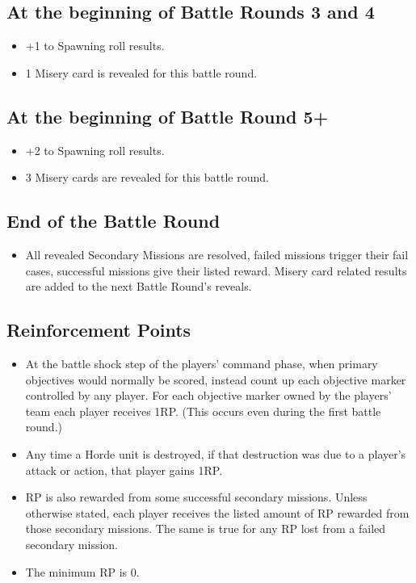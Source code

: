\documentclass{HordeModeTarot}
\begin{document}
\subsection{At the beginning of Battle Rounds 3 and 4 }
\begin{itemize}
\item +1 to Spawning roll results. 
\item 1 Misery card is revealed for this battle round.
\end{itemize}

\subsection{At the beginning of Battle Round 5+ }
\begin{itemize}
\item +2 to Spawning roll results. 
\item 3 Misery cards are revealed for this battle round.
\end{itemize}

\subsection{End of the Battle Round}
\begin{itemize}
\item All revealed Secondary Missions are resolved, failed missions trigger their fail cases, successful missions give their listed reward. Misery card related results are added to the next Battle Round’s reveals.
\end{itemize}

\subsection{Reinforcement Points}
\begin{itemize}
\item At the battle shock step of the players’ command phase, when primary objectives would normally be scored, instead count up each objective marker controlled by any player.  For each objective marker owned by the players’ team each player receives 1RP.  (This occurs even during the first battle round.)
\item Any time a Horde unit is destroyed, if that destruction was due to a player’s attack or action, that player gains 1RP. 
\item RP is also rewarded from some successful secondary missions. Unless otherwise stated, each player receives the listed amount of RP rewarded from those secondary missions. The same is true for any RP lost from a failed secondary mission.
\item The minimum RP is 0.
\end{itemize}
\end{document}
